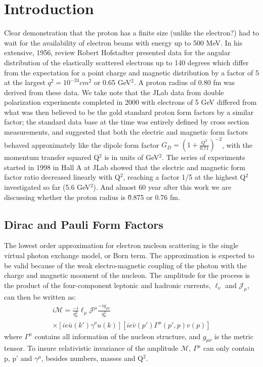 \section{Introduction}

Clear demonstration that the proton has a finite size (unlike the electron?) had to wait for the availability 
of electron beams with energy up to 500 MeV. In his extensive, 1956, review Robert Hofstadter presented data
for the angular distribution of the elastically scattered electrons up to 140 degrees which differ from the
expectation for a point charge and magnetic distribution by a factor of 5 at the largest
$ q^2= 10^{-24}cm^2$ or 0.65 GeV$^2$. A proton radius of 0.80 fm was derived from these data.
We take note that the JLab data from  double polarization experiments completed in 2000 with electrons of
5 GeV differed from what was then believed to be the gold standard proton form factors by a similar
factor; the standard data base at the time was entirely defined by cross section measurements, and
suggested that both the electric and magnetic form factors behaved approximately like the dipole form
factor $G_D=(1+\frac{Q^2}{0.71})^{-2}$, with the momentum transfer squared Q$^2$ is in units of GeV$^2$.
The series of experiments started in 1998 in Hall A at JLab showed that the electric and magnetic form
factor ratio decreased linearly with Q$^2$, reaching a factor 1/5 at the highest Q$^2$ investigated so
far (5.6 GeV$^2$). And almost 60 year after this work we are discussing whether the proton radius is
\~0.875 or 0.76 fm.

\subsection{Dirac and Pauli Form Factors}

The lowest order approximation for electron nucleon scattering is the single virtual photon exchange model,
 or Born term. The approximation is expected to be valid because of the weak electro-magnetic coupling of
 the photon with the charge and magnetic mooment of the nucleon. The amplitude for the process is the
product of the four-component leptonic and hadronic currents, $\ell_{\nu}$ and ${\mathcal J}_{\mu}$,
can then be written as:
\begin{eqnarray}
i{\mathcal M}=\frac{-i}{q_{\mu}^2}\ell_{\mu}{\mathcal J}^{\mu}\frac{-ig_{\mu\nu}}{q_{\mu}^2} \nonumber \\
             \times\left[ie\bar{u}(k')\gamma^{\nu}u(k)\right]\left[ie\bar{v}(p')\Gamma^{\mu}(p',p)v(p)\right]
\end{eqnarray}
where $\Gamma^{\mu}$ contains all information of the nucleon structure, and $g_{\mu\nu}$
is the metric tensor. To insure relativistic invariance of the amplitude
$\mathcal M$, $\Gamma^{\mu}$ can only contain p, p' and $\gamma^{\mu}$, besides numbers,
masses and Q$^2$.

